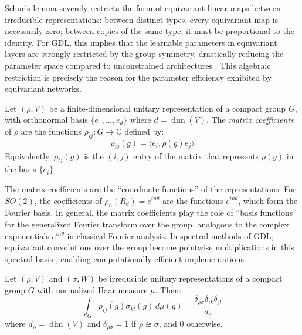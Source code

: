 Schur's lemma severely restricts the form of equivariant linear maps between irreducible representations: between distinct types, every equivariant map is necessarily zero; between copies of the same type, it must be proportional to the identity. For \gls{GDL}, this implies that the learnable parameters in equivariant layers are strongly restricted by the group symmetry, drastically reducing the parameter space compared to unconstrained architectures \citep{cohen2016steerablecnns}. This algebraic restriction is precisely the reason for the parameter efficiency exhibited by equivariant networks.

\begin{definition}\label{def:coeficientes_matriciales}
Let $(\rho, V)$ be a finite-dimensional unitary representation of a compact group $G$, with orthonormal basis $\{e_1, \ldots, e_d\}$ where $d = \dim(V)$. The \textit{matrix coefficients} of $\rho$ are the functions $\rho_{ij}: G \to \mathbb{C}$ defined by:
\begin{equation}
\rho_{ij}(g) = \langle e_i, \rho(g) e_j \rangle
\end{equation}
Equivalently, $\rho_{ij}(g)$ is the $(i,j)$ entry of the matrix that represents $\rho(g)$ in the basis $\{e_i\}$.
\end{definition}

The matrix coefficients are the ``coordinate functions'' of the representations. For $SO(2)$, the coefficients of $\rho_n(R_\theta) = e^{in\theta}$ are the functions $e^{in\theta}$, which form the Fourier basis. In general, the matrix coefficients play the role of ``basis functions'' for the generalized Fourier transform over the group, analogous to the complex exponentials $e^{in\theta}$ in classical Fourier analysis. In spectral methods of \gls{GDL}, equivariant convolutions over the group become pointwise multiplications in this spectral basis \citep{kondor2018generalizationconvolutionalneural}, enabling computationally efficient implementations.

\begin{proposition}\label{prop:ortogonalidad_schur}
Let $(\rho, V)$ and $(\sigma, W)$ be irreducible unitary representations of a compact group $G$ with normalized Haar measure $\mu$. Then:
\begin{equation}\label{eq:ortogonalidad_schur}
\int_G \overline{\rho_{ij}(g)} \sigma_{kl}(g) \, d\mu(g) = \frac{\delta_{\rho\sigma} \delta_{ik} \delta_{jl}}{d_\rho}
\end{equation}
where $d_\rho = \dim(V)$ and $\delta_{\rho\sigma} = 1$ if $\rho \cong \sigma$, and $0$ otherwise.
\end{proposition}


